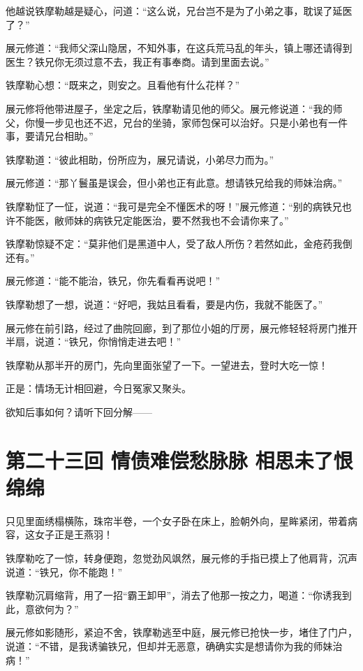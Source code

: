 \documentclass[12pt,oneside]{book}
\begin{document}
他越说铁摩勒越是疑心，问道：``这么说，兄台岂不是为了小弟之事，耽误了延医了？''

展元修道：``我师父深山隐居，不知外事，在这兵荒马乱的年头，镇上哪还请得到医生？铁兄你无须过意不去，我正有事奉商。请到里面去说。''

铁摩勒心想：``既来之，则安之。且看他有什么花样？''

展元修将他带进屋子，坐定之后，铁摩勒请见他的师父。展元修说道：``我的师父，你慢一步见也还不迟，兄台的坐骑，家师包保可以治好。只是小弟也有一件事，要请兄台相助。''

铁摩勒道：``彼此相助，份所应为，展兄请说，小弟尽力而为。''

展元修道：``那丫鬟虽是误会，但小弟也正有此意。想请铁兄给我的师妹治病。''

铁摩勒怔了一怔，说道：``我可是完全不懂医术的呀！''展元修道：``别的病铁兄也许不能医，敝师妹的病铁兄定能医治，要不然我也不会请你来了。''

铁摩勒惊疑不定：``莫非他们是黑道中人，受了敌人所伤？若然如此，金疮药我倒还有。''

展元修道：``能不能治，铁兄，你先看看再说吧！''

铁摩勒想了一想，说道：``好吧，我姑且看看，要是内伤，我就不能医了。''

展元修在前引路，经过了曲院回廊，到了那位小姐的厅房，展元修轻轻将房门推开半扇，说道：``铁兄，你悄悄走进去吧！''

铁摩勒从那半开的房门，先向里面张望了一下。一望进去，登时大吃一惊！

正是：情场无计相回避，今日冤家又聚头。

欲知后事如何？请听下回分解------

\chapter{第二十三回 情债难偿愁脉脉
相思未了恨绵绵}\label{ux7b2cux4e8cux5341ux4e09ux56de-ux60c5ux503aux96beux507fux6101ux8109ux8109-ux76f8ux601dux672aux4e86ux6068ux7ef5ux7ef5}

只见里面绣榻横陈，珠帘半卷，一个女子卧在床上，脸朝外向，星眸紧闭，带着病容，这女子正是王燕羽！

铁摩勒吃了一惊，转身便跑，忽觉劲风飒然，展元修的手指已摸上了他肩背，沉声说道：``铁兄，你不能跑！''

铁摩勒沉肩缩背，用了一招``霸王卸甲''，消去了他那一按之力，喝道：``你诱我到此，意欲何为？''

展元修如影随形，紧迫不舍，铁摩勒逃至中庭，展元修已抢快一步，堵住了门户，说道：``不错，是我诱骗铁兄，但却并无恶意，确确实实是想请你为我的师妹治病！''
\end{document}
